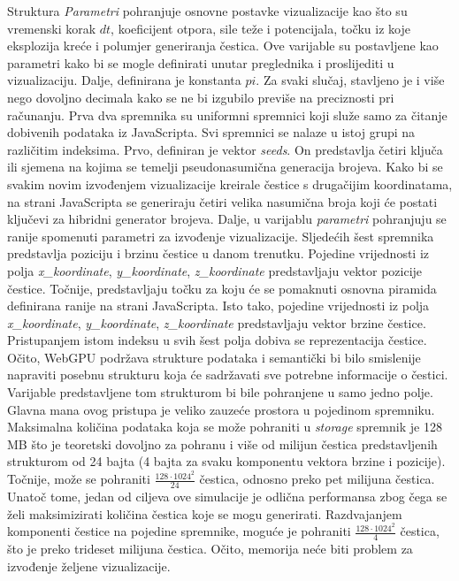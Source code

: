 \documentclass{foi}
\begin{document}
Struktura \textit{Parametri} pohranjuje osnovne postavke vizualizacije kao što su vremenski korak $dt$, koeficijent otpora, sile teže i potencijala, točku iz koje eksplozija kreće i polumjer generiranja čestica. Ove varijable su postavljene kao parametri kako bi se mogle definirati unutar preglednika i proslijediti u vizualizaciju. Dalje, definirana je konstanta $pi$. Za svaki slučaj, stavljeno je i više nego dovoljno decimala kako se ne bi izgubilo previše na preciznosti pri računanju. Prva dva spremnika su uniformni spremnici koji služe samo za čitanje dobivenih podataka iz JavaScripta. Svi spremnici se nalaze u istoj grupi na različitim indeksima. Prvo, definiran je vektor \textit{seeds}. On predstavlja četiri ključa ili sjemena na kojima se temelji pseudonasumična generacija brojeva. Kako bi se svakim novim izvođenjem vizualizacije kreirale čestice s drugačijim koordinatama, na strani JavaScripta se generiraju četiri velika nasumična broja koji će postati ključevi za hibridni generator brojeva. Dalje, u varijablu \textit{parametri} pohranjuju se ranije spomenuti parametri za izvođenje vizualizacije. Sljedećih šest spremnika predstavlja poziciju i brzinu čestice u danom trenutku. Pojedine vrijednosti iz polja \textit{x\_koordinate}, \textit{y\_koordinate}, \textit{z\_koordinate} predstavljaju vektor pozicije čestice. Točnije, predstavljaju točku za koju će se pomaknuti osnovna piramida definirana ranije na strani JavaScripta. Isto tako, pojedine vrijednosti iz polja \textit{x\_koordinate}, \textit{y\_koordinate}, \textit{z\_koordinate} predstavljaju vektor brzine čestice. Pristupanjem istom indeksu u svih šest polja dobiva se reprezentacija čestice. Očito, WebGPU podržava strukture podataka i semantički bi bilo smislenije napraviti posebnu strukturu koja će sadržavati sve potrebne informacije o čestici. Varijable predstavljene tom strukturom bi bile pohranjene u samo jedno polje. Glavna mana ovog pristupa je veliko zauzeće prostora u pojedinom spremniku. Maksimalna količina podataka koja se može pohraniti u \textit{storage} spremnik je 128 MB što je teoretski dovoljno za pohranu i više od milijun čestica predstavljenih strukturom od 24 bajta (4 bajta za svaku komponentu vektora brzine i pozicije). Točnije, može se pohraniti $\frac{128\cdot 1024^2}{24}$ čestica, odnosno preko pet milijuna čestica. Unatoč tome, jedan od ciljeva ove simulacije je odlična performansa zbog čega se želi maksimizirati količina čestica koje se mogu generirati. Razdvajanjem komponenti čestice na pojedine spremnike, moguće je pohraniti $\frac{128\cdot 1024^2}{4}$ čestica, što je preko trideset milijuna čestica. Očito, memorija neće biti problem za izvođenje željene vizualizacije.
\end{document}
